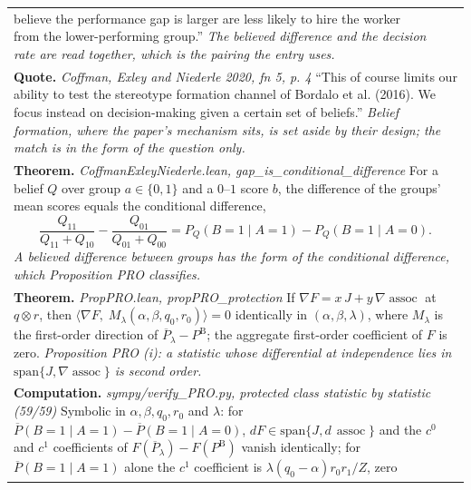 \documentclass[10pt]{article}
\theoremstyle{definition}
\newcommand{\PB}{P^{\mathrm{B}}}
\newcommand{\Pbar}{\overline{P}}
\newcommand{\assoc}{\operatorname{assoc}}
\newlength{\fullw}\setlength{\fullw}{25.9cm}
\begin{document}
{\begin{longtable}{|p{0.9cm}|p{12.2cm}|p{12.2cm}|}
{believe the performance gap is larger are less likely to hire the worker from the
lower-performing group.'' \newline \textit{The believed difference and the decision rate are read together, which is the pairing the entry uses.}} \\
\multicolumn{3}{|p{\fullw}|}{\textbf{Quote.} \textit{Coffman, Exley and Niederle 2020, fn 5, p. 4} \newline ``This of course limits our ability to test the stereotype formation channel of
Bordalo et al. (2016). We focus instead on decision-making given a certain set of
beliefs.'' \newline \textit{Belief formation, where the paper's mechanism sits, is set aside by their design; the match is in the form of the question only.}} \\
\multicolumn{3}{|p{\fullw}|}{\textbf{Theorem.} \textit{CoffmanExleyNiederle.lean, gap\_is\_conditional\_difference} \newline For a belief $Q$ over group $a\in\{0,1\}$ and a $0$--$1$ score $b$, the difference of
the groups' mean scores equals the conditional difference,
\[
\frac{Q_{11}}{Q_{11}+Q_{10}}-\frac{Q_{01}}{Q_{01}+Q_{00}}
 = P_Q(B{=}1\mid A{=}1)-P_Q(B{=}1\mid A{=}0).
\] \newline \textit{A believed difference between groups has the form of the conditional difference, which Proposition PRO classifies.}} \\
\multicolumn{3}{|p{\fullw}|}{\textbf{Theorem.} \textit{PropPRO.lean, propPRO\_protection} \newline If $\nabla F=x\,J+y\,\nabla\assoc$ at $q\otimes r$, then
$\langle\nabla F,\;M_\lambda(\alpha,\beta,q_0,r_0)\rangle=0$ identically in
$(\alpha,\beta,\lambda)$, where $M_\lambda$ is the first-order direction of
$\Pbar_\lambda-\PB$; the aggregate first-order coefficient of $F$ is zero. \newline \textit{Proposition PRO (i): a statistic whose differential at independence lies in $\mathrm{span}\{J,\nabla\assoc\}$ is second order.}} \\
\multicolumn{3}{|p{\fullw}|}{\textbf{Computation.} \textit{sympy/verify\_PRO.py, protected class statistic by statistic (59/59)} \newline Symbolic in $\alpha,\beta,q_0,r_0$ and $\lambda$:
for $\Pbar(B{=}1\mid A{=}1)-\Pbar(B{=}1\mid A{=}0)$, $dF\in\mathrm{span}\{J,d\,\assoc\}$ and the
$c^0$ and $c^1$ coefficients of $F(\Pbar_\lambda)-F(\PB)$ vanish identically; for
$\Pbar(B{=}1\mid A{=}1)$ alone the $c^1$ coefficient is $\lambda(q_0-\alpha)r_0r_1/Z$, zero
}
\end{longtable}}
\end{document}
